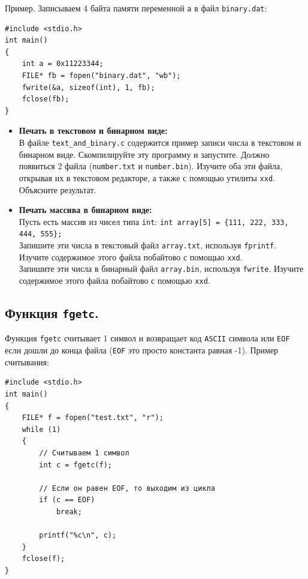 \documentclass[10pt]{article}
\begin{document}
Пример. Записываем 4 байта памяти переменной \texttt{a} в файл \texttt{binary.dat}:
\begin{lstlisting}
#include <stdio.h>
int main() 
{
    int a = 0x11223344;
    FILE* fb = fopen("binary.dat", "wb");
    fwrite(&a, sizeof(int), 1, fb);
    fclose(fb);
}
\end{lstlisting}

\begin{itemize}
\item \textbf{Печать в текстовом и бинарном виде:}\\
В файле \texttt{text\_and\_binary.c} содержится пример записи числа в текстовом и бинарном виде. Скомпилируйте эту программу и запустите. Должно появиться 2 файла (\texttt{number.txt} и \texttt{number.bin}). Изучите оба эти файла, открывая их в текстовом редакторе, а также с помощью утилиты \texttt{xxd}. Объясните результат.


\item \textbf{Печать массива в бинарном виде:}\\
Пусть есть массив из чисел типа \texttt{int}: \texttt{int array[5] = \{111, 222, 333, 444, 555\};}\\
Запишите эти числа в текстовый файл \texttt{array.txt}, используя \texttt{fprintf}. Изучите содержимое этого файла побайтово с помощью \texttt{xxd}.\\
Запишите эти числа в бинарный файл \texttt{array.bin}, используя \texttt{fwrite}. Изучите содержимое этого файла побайтово с помощью \texttt{xxd}.
\end{itemize}


\newpage
\subsection*{Функция \texttt{fgetс}.}
Функция \texttt{fgetc} считывает 1 символ и возвращает код \texttt{ASCII} символа или \texttt{EOF} если дошли до конца файла (\texttt{EOF} это просто константа равная -1). Пример считывания:

\begin{lstlisting}
#include <stdio.h>
int main()
{
    FILE* f = fopen("test.txt", "r");
    while (1)
    {
        // Считываем 1 символ
        int c = fgetc(f);
		
        // Если он равен EOF, то выходим из цикла
        if (c == EOF)
            break;
            
        printf("%c\n", c);
	}
    fclose(f);
}
\end{lstlisting}
\end{document}
